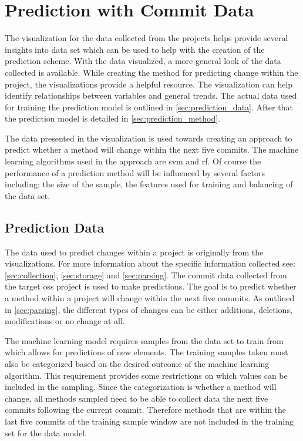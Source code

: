 \chapter{Prediction with Commit Data}
\label{chap:prediction}


The visualization for the data collected from the projects helps provide several insights into data set which can be used to help with the creation of the prediction scheme. With the data visualized, a more general look of the data collected is available. While creating the method for predicting change within the project, the visualizations provide a helpful resource. The visualization can help identify relationships between variables and general trends. The actual data used for training the prediction model is outlined in \autoref{sec:prediction_data}. After that the prediction model is detailed in \autoref{sec:prediction_method}. %

The data presented in the visualization is used towards creating an approach to predict whether a method will change within the next five commits. The machine learning algorithms used in the approach are \gls{svm} and \gls{rf}. Of course the performance of a prediction method will be influenced by several factors including; the size of the sample, the features used for training and balancing of the data set.

\section{Prediction Data}
\label{sec:prediction_data}

The data used to predict changes within a project is originally from the visualizations. For more information about the specific information collected see: \autoref{sec:collection}, \autoref{sec:storage} and \autoref{sec:parsing}. The commit data collected from the target \gls{oss} project is used to make predictions. The goal is to predict whether a method within a project will change within the next five commits. As outlined in \autoref{sec:parsing}, the different types of changes can be either additions, deletions, modifications or no change at all.

The machine learning model requires samples from the data set to train from which allows for predictions of new elements. The training samples taken must also be categorized based on the desired outcome of the machine learning algorithm. This requirement provides some restrictions on which values can be included in the sampling. Since the categorization is whether a method will change, all methods sampled need to be able to collect data the next five commits following the current commit. Therefore methods that are within the last five commits of the training sample window are not included in the training set for the data model.

